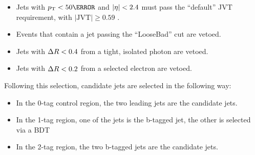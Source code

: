\begin{itemize}
  \item Jets with $\pt < \unit{50}{\GeV}$ and $|\eta| < 2.4$ must pass the ``default'' \gls{JVT} requirement, with $|\text{JVT}| \geq 0.59$ \cite{JVT}.
  \item Events that contain a jet passing the ``LooseBad'' cut are vetoed. 
  \item Jets with $\Delta R < 0.4$ from a tight, isolated photon are vetoed.
  \item Jets with $\Delta R < 0.2$ from a selected electron are vetoed.
\end{itemize}



Following this selection, candidate jets are selected in the following way:
\begin{itemize}
  \item In the 0-tag control region, the two leading jets are the candidate jets.
  \item In the 1-tag region, one of the jets is the b-tagged jet, the other is selected via a \gls{BDT}
  \item In the 2-tag region, the two b-tagged jets are the candidate jets.
\end{itemize}

